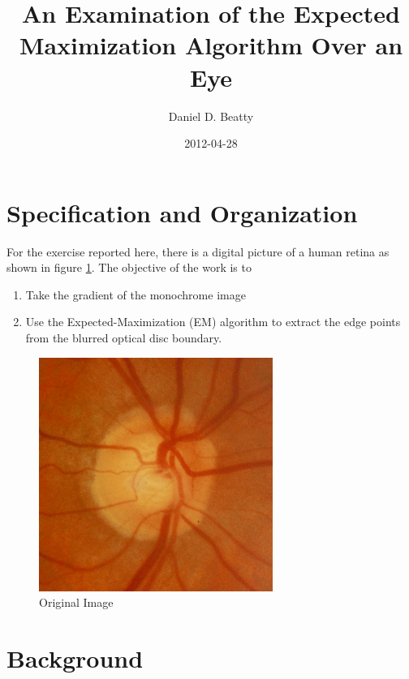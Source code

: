 \documentclass[]{article}
\title{An Examination of the Expected Maximization Algorithm Over an Eye}
\author{Daniel D. Beatty  }
\date{2012-04-28}
\begin{document}
\ifpdf
{}
\else
{}
\fi

\maketitle


\begin{abstract}
\end{abstract}

\section{Specification and Organization} %
\label{sec:specification}
For the exercise reported here, there is a digital picture of a human retina as shown in figure \ref{fig:8706423-90odl}.  The objective of the work is to 
\begin{enumerate}
	\item Take the gradient of the monochrome image
	\item Use the Expected-Maximization (EM) algorithm to extract the edge points from the blurred optical disc boundary.
\end{enumerate}
\begin{figure}[htbp]
	\centering
		\includegraphics[height=3in]{8706423-90odl.png}
	\caption{Original Image}
	\label{fig:8706423-90odl}
\end{figure}



\section{Background} %
\label{sec:background}
\end{document}
